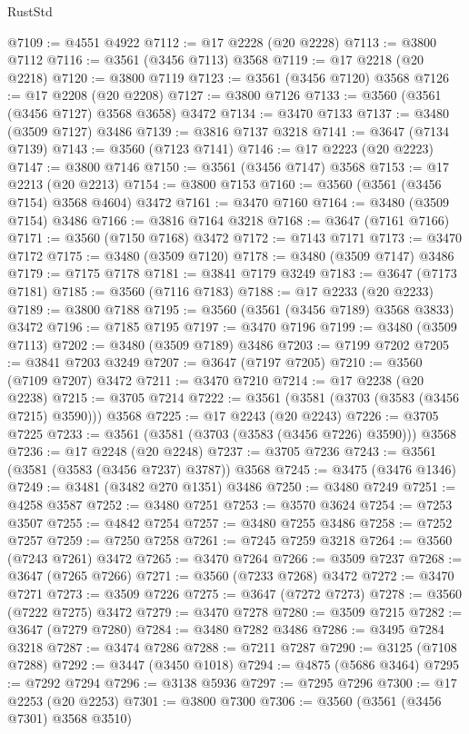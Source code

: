 \begin{lexlean}{RustStd}
\begin{coremodule}
{\begin{coremodule}
{{{{{{{{{{{{{{{{{{{{{{{{{{{{{{{{{{{{{{{{{{{{{@7109 := @4551 @4922
@7112 := @17 @2228 (@20 @2228)
@7113 := @3800 @7112
@7116 := @3561 (@3456 @7113) @3568
@7119 := @17 @2218 (@20 @2218)
@7120 := @3800 @7119
@7123 := @3561 (@3456 @7120) @3568
@7126 := @17 @2208 (@20 @2208)
@7127 := @3800 @7126
@7133 := @3560 (@3561 (@3456 @7127) @3568 @3658) @3472
@7134 := @3470 @7133
@7137 := @3480 (@3509 @7127) @3486
@7139 := @3816 @7137 @3218
@7141 := @3647 (@7134 @7139)
@7143 := @3560 (@7123 @7141)
@7146 := @17 @2223 (@20 @2223)
@7147 := @3800 @7146
@7150 := @3561 (@3456 @7147) @3568
@7153 := @17 @2213 (@20 @2213)
@7154 := @3800 @7153
@7160 := @3560 (@3561 (@3456 @7154) @3568 @4604) @3472
@7161 := @3470 @7160
@7164 := @3480 (@3509 @7154) @3486
@7166 := @3816 @7164 @3218
@7168 := @3647 (@7161 @7166)
@7171 := @3560 (@7150 @7168) @3472
@7172 := @7143 @7171
@7173 := @3470 @7172
@7175 := @3480 (@3509 @7120)
@7178 := @3480 (@3509 @7147) @3486
@7179 := @7175 @7178
@7181 := @3841 @7179 @3249
@7183 := @3647 (@7173 @7181)
@7185 := @3560 (@7116 @7183)
@7188 := @17 @2233 (@20 @2233)
@7189 := @3800 @7188
@7195 := @3560 (@3561 (@3456 @7189) @3568 @3833) @3472
@7196 := @7185 @7195
@7197 := @3470 @7196
@7199 := @3480 (@3509 @7113)
@7202 := @3480 (@3509 @7189) @3486
@7203 := @7199 @7202
@7205 := @3841 @7203 @3249
@7207 := @3647 (@7197 @7205)
@7210 := @3560 (@7109 @7207) @3472
@7211 := @3470 @7210
@7214 := @17 @2238 (@20 @2238)
@7215 := @3705 @7214
@7222 := @3561 (@3581 (@3703 (@3583 (@3456 @7215) @3590))) @3568
@7225 := @17 @2243 (@20 @2243)
@7226 := @3705 @7225
@7233 := @3561 (@3581 (@3703 (@3583 (@3456 @7226) @3590))) @3568
@7236 := @17 @2248 (@20 @2248)
@7237 := @3705 @7236
@7243 := @3561 (@3581 (@3583 (@3456 @7237) @3787)) @3568
@7245 := @3475 (@3476 @1346)
@7249 := @3481 (@3482 @270 @1351) @3486
@7250 := @3480 @7249
@7251 := @4258 @3587
@7252 := @3480 @7251
@7253 := @3570 @3624
@7254 := @7253 @3507
@7255 := @4842 @7254
@7257 := @3480 @7255 @3486
@7258 := @7252 @7257
@7259 := @7250 @7258
@7261 := @7245 @7259 @3218
@7264 := @3560 (@7243 @7261) @3472
@7265 := @3470 @7264
@7266 := @3509 @7237
@7268 := @3647 (@7265 @7266)
@7271 := @3560 (@7233 @7268) @3472
@7272 := @3470 @7271
@7273 := @3509 @7226
@7275 := @3647 (@7272 @7273)
@7278 := @3560 (@7222 @7275) @3472
@7279 := @3470 @7278
@7280 := @3509 @7215
@7282 := @3647 (@7279 @7280)
@7284 := @3480 @7282 @3486
@7286 := @3495 @7284 @3218
@7287 := @3474 @7286
@7288 := @7211 @7287
@7290 := @3125 (@7108 @7288)
@7292 := @3447 (@3450 @1018)
@7294 := @4875 (@5686 @3464)
@7295 := @7292 @7294
@7296 := @3138 @5936
@7297 := @7295 @7296
@7300 := @17 @2253 (@20 @2253)
@7301 := @3800 @7300
@7306 := @3560 (@3561 (@3456 @7301) @3568 @3510)
}}}}}}}}}}}}}}}}}}}}}}}}}}}}}}}}}}}}}}}}}}}}}
\end{coremodule}}
\end{coremodule}
\end{lexlean}

